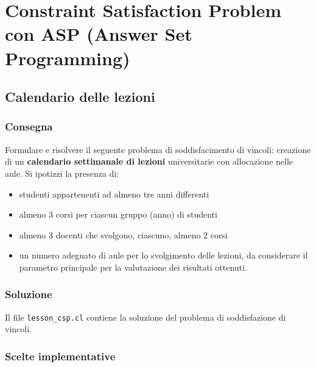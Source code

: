 \documentclass[a4paper,oneside,12pt]{book}
\def \code#1{\texttt{#1}}
\begin{document}
    \section*{Constraint Satisfaction Problem con ASP (Answer Set Programming)}
    \subsection*{Calendario delle lezioni}
    \subsubsection{Consegna}
    Formulare e risolvere il seguente problema di soddisfacimento
    di vincoli:
    creazione di un \textbf{calendario settimanale di lezioni} universitarie con
    allocazione nelle aule. Si ipotizzi la presenza di:
    \begin{itemize}
        \item studenti appartenenti ad almeno tre anni differenti
        \item almeno 3 corsi per ciascun gruppo (anno) di studenti
        \item almeno 3 docenti che svolgono, ciascuno, almeno 2
        corsi
        \item un numero adeguato di aule per lo svolgimento delle
        lezioni, da considerare il parametro principale per la
        valutazione dei risultati ottenuti.
    \end{itemize}

    \subsubsection{Soluzione}
    Il file \code{lesson\_csp.cl} contiene la soluzione del problema di soddisfazione di vincoli.
    \subsubsection*{Scelte implementative}
\end{document}
